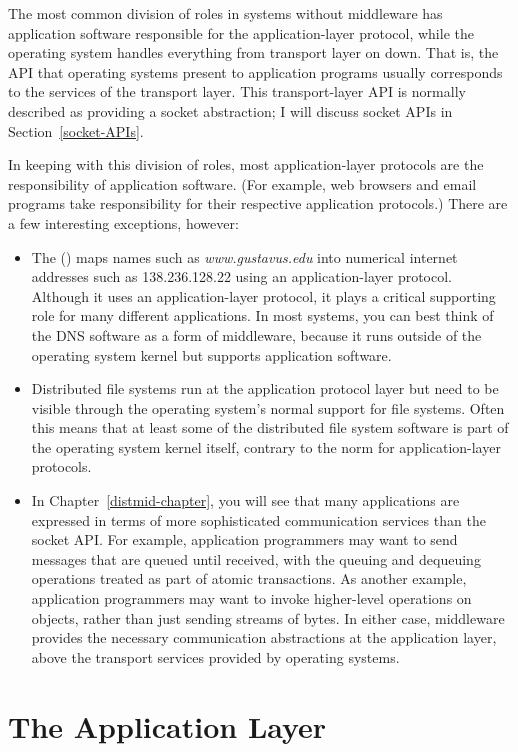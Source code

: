 The most common division of roles in systems without middleware has
application software responsible for the application-layer protocol,
while the operating system handles everything from transport layer on
down.  That is, the API that operating systems present to application
programs usually corresponds to the services of the transport layer.
This transport-layer API is normally described as providing a
socket abstraction; I will discuss socket APIs in
Section~\ref{socket-APIs}.

In keeping with this division of roles, most application-layer protocols are the
responsibility of application software.  (For example, web browsers and
email programs take responsibility for their respective application
protocols.)  There are a few interesting exceptions, however:
\begin{itemize}
\item
The  () maps names such
as \textit{www.gustavus.edu} into numerical internet addresses such as
138.236.128.22 using an application-layer protocol.  Although
it uses an application-layer protocol, it
plays a critical supporting role for many different applications.  In
most systems, you can best think of the DNS software as a form
of middleware, because it runs outside of the operating system kernel
but supports application software.
\item
Distributed file systems run at the application protocol layer but
need to be visible through the operating system's normal support for
file systems.  Often this means that at least some of the distributed
file system
software is part of the operating system kernel itself, contrary to
the norm for application-layer protocols.
\item
In Chapter~\ref{distmid-chapter}, you will see that many applications are expressed
in terms of more sophisticated communication services than the socket
API.  For example, application programmers may want to send messages that are
queued until received, with the queuing and dequeuing operations
treated as part of atomic transactions.  As another example, application programmers may want to
invoke higher-level operations on objects, rather than just sending
streams of bytes.  In either case, middleware provides the necessary
communication abstractions at the application layer, above the
transport services provided by operating systems.
\end{itemize}

\section{The Application Layer}\label{application-layer-section}

